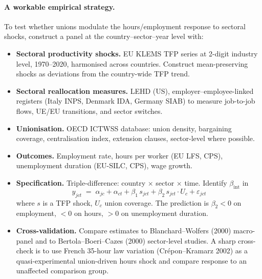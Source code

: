 \documentclass[11pt,a4paper]{article}
\begin{document}
\paragraph{A workable empirical strategy.}
To test whether unions modulate the hours/employment response to sectoral shocks, construct a panel at the country--sector--year level with:

\begin{itemize}[leftmargin=*,itemsep=2pt]
    \item \textbf{Sectoral productivity shocks.} EU KLEMS TFP series at 2-digit industry level, 1970--2020, harmonised across countries. Construct mean-preserving shocks as deviations from the country-wide TFP trend.
    \item \textbf{Sectoral reallocation measures.} LEHD (US), employer--employee-linked registers (Italy INPS, Denmark IDA, Germany SIAB) to measure job-to-job flows, UE/EU transitions, and sector switches.
    \item \textbf{Unionisation.} OECD ICTWSS database: union density, bargaining coverage, centralisation index, extension clauses, sector-level where possible.
    \item \textbf{Outcomes.} Employment rate, hours per worker (EU LFS, CPS), unemployment duration (EU-SILC, CPS), wage growth.
    \item \textbf{Specification.} Triple-difference: country $\times$ sector $\times$ time. Identify $\beta_{\text{int}}$ in
    \[
    y_{jct}\;=\;\alpha_{jc}+\alpha_{ct}+\beta_1\,s_{jct}+\beta_2\,s_{jct}\cdot U_{c}+\varepsilon_{jct}
    \]
    where $s$ is a TFP shock, $U_c$ union coverage. The prediction is $\beta_2<0$ on employment, $<0$ on hours, $>0$ on unemployment duration.
    \item \textbf{Cross-validation.} Compare estimates to Blanchard--Wolfers (2000) macro-panel and to Bertola--Boeri--Cazes (2000) sector-level studies. A sharp cross-check is to use French 35-hour law variation (Crépon--Kramarz 2002) as a quasi-experimental union-driven hours shock and compare response to an unaffected comparison group.
\end{itemize}
\end{document}

